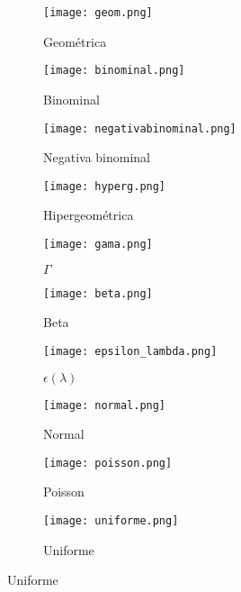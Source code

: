 \begin{figure}[H]
\begin{subfigure}{.5\textwidth}\centering
\texttt{[image: geom.png]}
\caption{Geométrica}
\end{subfigure}\begin{subfigure}{.5\textwidth}\centering
\texttt{[image: binominal.png]}
\caption{Binominal}
\end{subfigure}

\begin{subfigure}{.5\textwidth}\centering
\texttt{[image: negativabinominal.png]}
\caption{Negativa binominal}
\end{subfigure}\begin{subfigure}{.5\textwidth}\centering
\texttt{[image: hyperg.png]}
\caption{Hipergeométrica}
\end{subfigure}

\begin{subfigure}{.5\textwidth}\centering
\texttt{[image: gama.png]}
\caption{$\Gamma$}
\end{subfigure}\begin{subfigure}{.5\textwidth}\centering
\texttt{[image: beta.png]}
\caption{Beta}
\end{subfigure}

\begin{subfigure}{.5\textwidth}\centering
\texttt{[image: epsilon\_lambda.png]}
\caption{$\epsilon(\lambda)$}
\end{subfigure}\begin{subfigure}{.5\textwidth}\centering
\texttt{[image: normal.png]}
\caption{Normal}
\end{subfigure}

\begin{subfigure}{.5\textwidth}\centering
\texttt{[image: poisson.png]}
\caption{Poisson}
\end{subfigure}\begin{subfigure}{.5\textwidth}\centering
\texttt{[image: uniforme.png]}
\caption{Uniforme}
\end{subfigure}
\end{figure}